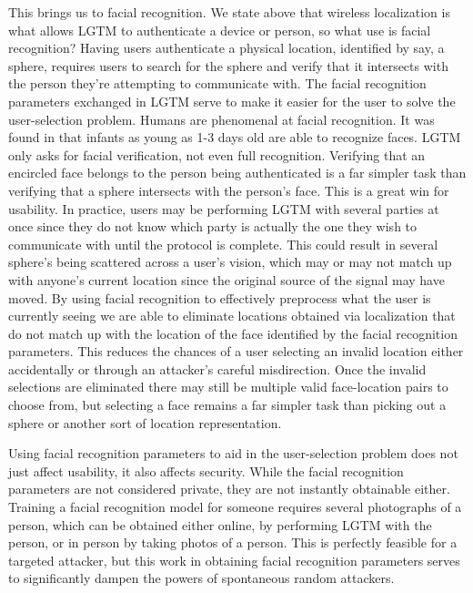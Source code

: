 \documentclass[12pt]{report}
\begin{document}
This brings us to facial recognition. We state above that wireless localization is what allows LGTM to authenticate a device or person, so what use is facial recognition? Having users authenticate a physical location, identified by say, a sphere, requires users to search for the sphere and verify that it intersects with the person they're attempting to communicate with. The facial recognition parameters exchanged in LGTM serve to make it easier for the user to solve the user-selection problem. Humans are phenomenal at facial recognition. It was found in \cite{NewbornsFaceRecognitionTurati2006} that infants as young as 1-3 days old are able to recognize faces. LGTM only asks for facial verification, not even full recognition. Verifying that an encircled face belongs to the person being authenticated is a far simpler task than verifying that a sphere intersects with the person's face. This is a great win for usability. In practice, users may be performing LGTM with several parties at once since they do not know which party is actually the one they wish to communicate with until the protocol is complete. This could result in several sphere's being scattered across a user's vision, which may or may not match up with anyone's current location since the original source of the signal may have moved. By using facial recognition to effectively preprocess what the user is currently seeing we are able to eliminate locations obtained via localization that do not match up with the location of the face identified by the facial recognition parameters. This reduces the chances of a user selecting an invalid location either accidentally or through an attacker's careful misdirection. Once the invalid selections are eliminated there may still be multiple valid face-location pairs to choose from, but selecting a face remains a far simpler task than picking out a sphere or another sort of location representation. \par

Using facial recognition parameters to aid in the user-selection problem does not just affect usability, it also affects security. While the facial recognition parameters are not considered private, they are not instantly obtainable either. Training a facial recognition model for someone requires several photographs of a person, which can be obtained either online, by performing LGTM with the person, or in person by taking photos of a person. This is perfectly feasible for a targeted attacker, but this work in obtaining facial recognition parameters serves to significantly dampen the powers of spontaneous random attackers. \par
\end{document}
